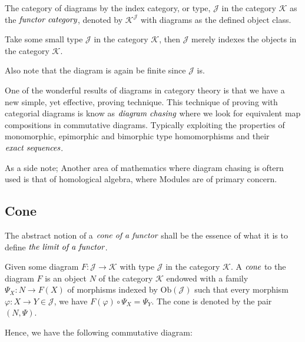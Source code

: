 \begin{defn}
 The category of diagrams by the index category, or type, $\mathcal{J}$ in the category $\mathcal{K}$ as the $\emph{functor category}$,
 denoted by $\mathcal{K}^{\mathcal{J}}$ with diagrams as the defined object class.
\end{defn}

\begin{exmp}
 Take some small type $\mathcal{J}$ in the category $\mathcal{K}$,
 then $\mathcal{J}$ merely indexes the objects in the category $\mathcal{K}$.
 \begin{rem}
  Also note that the diagram is again be finite since $\mathcal{J}$ is.
 \end{rem}
\end{exmp}

One of the wonderful results of diagrams in category theory is that we have a new simple, yet effective, proving technique.
This technique of proving with categorial diagrams is know as $\emph{diagram chasing}$ where we look for equivalent map compositions in commutative diagrams.
Typically exploiting the properties of monomorphic, epimorphic and bimorphic type homomorphisms and their $\emph{exact sequences}$.
\begin{note}
 As a side note;
 Another area of mathematics where diagram chasing is oftern used is that of homological algebra, where Modules are of primary concern.
\end{note}

\subsection{Cone} %
\label{subsec:cone}
The abstract notion of a $\emph{cone of a functor}$ shall be the essence of what it is to define $\emph{the limit of a functor}$.

\begin{defn}
 Given some diagram $F: \mathcal{J} \to \mathcal{K}$ with type $\mathcal{J}$ in the category $\mathcal{K}$.
 A $\emph{cone}$ to the diagram $F$ is an object $N$ of the category $\mathcal{K}$ endowed with a family $\Psi_{X}: N \to F(X)$ of morphisms
 indexed by $\text{Ob}(\mathcal{J})$ such that every morphism $\varphi: X \to Y \in \mathcal{J}$, we have $F(\varphi) \circ \Psi_{X} = \Psi_{Y}$.
 The cone is denoted by the pair $(N, \Psi)$.
\end{defn}

Hence, we have the following commutative diagram:

